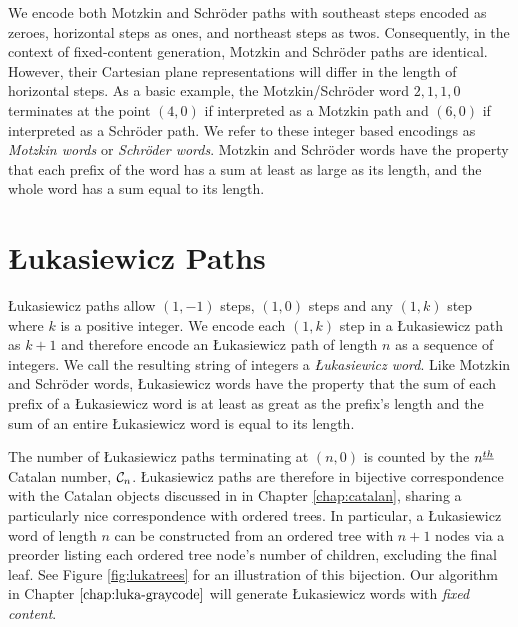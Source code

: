 We encode both Motzkin and Schröder paths with southeast steps encoded as zeroes, horizontal steps as ones, and northeast steps as twos.
Consequently, in the context of fixed-content generation, Motzkin and Schröder paths are identical.  However, their Cartesian plane representations will differ in the length of horizontal steps. As a basic example, the Motzkin/Schröder word $2,1,1,0$ terminates at the point $(4,0)$ if interpreted as a Motzkin path and $(6,0)$ if interpreted as a Schröder path.  We refer to these integer based encodings as \emph{Motzkin words} or \emph{Schröder words}.  Motzkin and Schröder words have the property that each prefix of the word has a sum at least as large as its length, and the whole word has a sum equal to its length.



\section{Łukasiewicz Paths}\label{sec:lukasiewicz}

Łukasiewicz paths allow $(1,-1)$ steps, $(1,0)$ steps and any $(1,k)$ step where $k$ is a positive integer. We encode each $(1,k)$ step in a Łukasiewicz path as $k+1$ and therefore encode an Łukasiewicz path of length $n$ as a sequence of integers.  We call the resulting string of integers a \emph{Łukasiewicz word}.  Like Motzkin and Schröder words, Łukasiewicz words have the property that the sum of each prefix of a Łukasiewicz word is at least as great as the prefix's length and the sum of an entire Łukasiewicz word is equal to its length. 

The number of Łukasiewicz paths terminating at $(n,0)$ is counted by the $n^{\underline{th}}$ Catalan number, $\mathcal{C}_n$. Łukasiewicz paths are therefore in bijective correspondence with the Catalan objects discussed in in Chapter \ref{chap:catalan}, sharing a particularly nice correspondence with ordered trees. In particular, a Łukasiewicz word of length $n$ can be constructed from an ordered tree with $n+1$ nodes via a preorder listing each ordered tree node's number of children, excluding the final leaf.  See Figure \ref{fig:lukatrees} for an illustration of this bijection.
Our algorithm in Chapter $\ref{chap:luka-graycode}$ will generate Łukasiewicz words with \emph{fixed content}.


